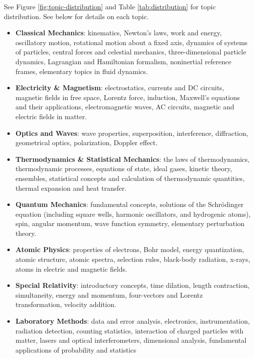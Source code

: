 See Figure \ref{fig:topic-distribution} and Table \ref{tab:distribution} for topic distribution. See below for details on each topic.

\begin{itemize}
    \item {\bfseries Classical Mechanics}: kinematics, Newton's laws, work and energy, oscillatory motion, rotational motion about a fixed axis, dynamics of systems of particles, central forces and celestial mechanics, three-dimensional particle dynamics, Lagrangian and Hamiltonian formalism, noninertial reference frames, elementary topics in fluid dynamics.
    \item {\bfseries Electricity \& Magnetism}: electrostatics, currents and DC circuits, magnetic fields in free space, Lorentz force, induction, Maxwell's equations and their applications, electromagnetic waves, AC circuits, magnetic and electric fields in matter.
    
    \item {\bfseries Optics and Waves}: wave properties, superposition, interference, diffraction, geometrical optics, polarization, Doppler effect.
    
    \item {\bfseries Thermodynamics \& Statistical Mechanics}: the laws of thermodynamics, thermodynamic processes, equations of state, ideal gases, kinetic theory, ensembles, statistical concepts and calculation of thermodynamic quantities, thermal expansion and heat transfer.
    
    \item {\bfseries Quantum Mechanics}: fundamental concepts, solutions of the Schrödinger equation (including square wells, harmonic oscillators, and hydrogenic atoms), spin, angular momentum, wave function symmetry, elementary perturbation theory.
    
    \item {\bfseries Atomic Physics}: properties of electrons, Bohr model, energy quantization, atomic structure, atomic spectra, selection rules, black-body radiation, x-rays, atoms in electric and magnetic fields.
    
    \item {\bfseries Special Relativity}: introductory concepts, time dilation, length contraction, simultaneity, energy and momentum, four-vectors and Lorentz transformation, velocity addition.
    
    \item {\bfseries Laboratory Methods}: data and error analysis, electronics, instrumentation, radiation detection, counting statistics, interaction of charged particles with matter, lasers and optical interferometers, dimensional analysis, fundamental applications of probability and statistics
    

\end{itemize}
